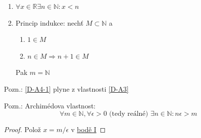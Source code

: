 \begin{definitionAi}[name=Vlastnosti \texorpdfstring{$\mathbb{N}$}{N}, label=D-A4]\noindent
	\begin{enumerate}[I]
		\item\label{D-A4-1} $\forall x\in\mathbb{R}\exists n\in\mathbb{N}: x<n$
		\item Princip indukce: nechť $M\subset\mathbb{N}$ a
			\begin{enumerate}
				\item $1\in M$
				\item $n\in M \Rightarrow n+1\in M$
			\end{enumerate}
			Pak $m=\mathbb{N}$
	\end{enumerate}
\end{definitionAi}

Pozn.: \autoref{D-A4-1} plyne z vlastnosti \autoref{D-A3}

Pozn.: Archimédova vlastnost:
\begin{equation}
	\forall m\in\mathbb{N}, \forall \epsilon>0 \text{ (tedy reálné) }\exists n\in\mathbb{N}:n\epsilon>m
\end{equation}
\begin{proof}
	Polož $x=m/\epsilon$ v \hyperref[D-A4-1]{bodě I}
\end{proof}

